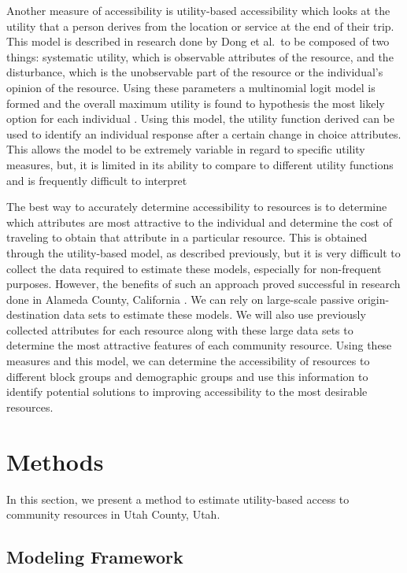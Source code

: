 \documentclass[3p, authoryear]{elsarticle} %
\begin{document}
Another measure of accessibility is utility-based accessibility which looks at
the utility that a person derives from the location or service at the end of
their trip. This model is described in research done by Dong et al.~to be
composed of two things: systematic utility, which is observable attributes of
the resource, and the disturbance, which is the unobservable part of the
resource or the individual's opinion of the resource. Using these parameters a
multinomial logit model is formed and the overall maximum utility is found to
hypothesis the most likely option for each individual \citep{dong2006moving}. Using
this model, the utility function derived can be used to identify an individual
response after a certain change in choice attributes. This allows the model to
be extremely variable in regard to specific utility measures, but, it is limited
in its ability to compare to different utility functions and is frequently
difficult to interpret \citep{handy1997measuring}

The best way to accurately determine accessibility to resources is to determine
which attributes are most attractive to the individual and determine the cost of
traveling to obtain that attribute in a particular resource. This is obtained
through the utility-based model, as described previously, but it is very
difficult to collect the data required to estimate these models, especially for
non-frequent purposes. However, the benefits of such an approach proved
successful in research done in Alameda County, California \citep{macfarlane2020modeling}. We can rely on large-scale passive origin-destination data sets to
estimate these models. We will also use previously collected attributes for each
resource along with these large data sets to determine the most attractive
features of each community resource. Using these measures and this model, we can
determine the accessibility of resources to different block groups and
demographic groups and use this information to identify potential solutions to
improving accessibility to the most desirable resources.

\hypertarget{methods}{%
\section{Methods}\label{methods}}

In this section, we present a method to estimate utility-based access to
community resources in Utah County, Utah.

\hypertarget{modeling-framework}{%
\subsection{Modeling Framework}\label{modeling-framework}}
\end{document}
